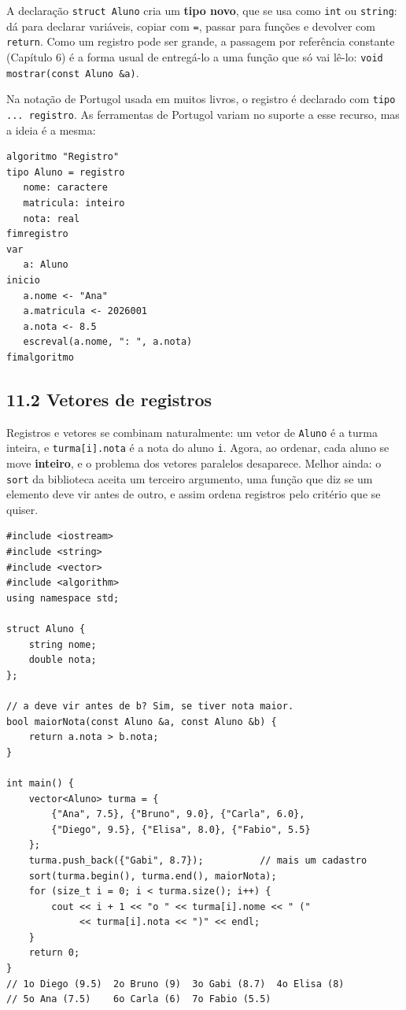 A declaração \texttt{struct Aluno} cria um \textbf{tipo novo}, que se usa como \texttt{int} ou \texttt{string}: dá para declarar variáveis, copiar com \texttt{=}, passar para funções e devolver com \texttt{return}. Como um registro pode ser grande, a passagem por referência constante (Capítulo 6) é a forma usual de entregá-lo a uma função que só vai lê-lo: \texttt{void mostrar(const Aluno \&a)}.

Na notação de Portugol usada em muitos livros, o registro é declarado com \texttt{tipo ... registro}. As ferramentas de Portugol variam no suporte a esse recurso, mas a ideia é a mesma:

\begin{codigo}
\begin{Verbatim}[breaklines=true, breaksymbolleft={}, fontsize=\footnotesize]
algoritmo "Registro"
tipo Aluno = registro
   nome: caractere
   matricula: inteiro
   nota: real
fimregistro
var
   a: Aluno
inicio
   a.nome <- "Ana"
   a.matricula <- 2026001
   a.nota <- 8.5
   escreval(a.nome, ": ", a.nota)
fimalgoritmo
\end{Verbatim}
\end{codigo}

\subsection{11.2 Vetores de registros}

Registros e vetores se combinam naturalmente: um vetor de \texttt{Aluno} é a turma inteira, e \texttt{turma[i].nota} é a nota do aluno \texttt{i}. Agora, ao ordenar, cada aluno se move \textbf{inteiro}, e o problema dos vetores paralelos desaparece. Melhor ainda: o \texttt{sort} da biblioteca aceita um terceiro argumento, uma função que diz se um elemento deve vir antes de outro, e assim ordena registros pelo critério que se quiser.

\begin{codigo}
\begin{Verbatim}[breaklines=true, breaksymbolleft={}, fontsize=\footnotesize]
#include <iostream>
#include <string>
#include <vector>
#include <algorithm>
using namespace std;

struct Aluno {
    string nome;
    double nota;
};

// a deve vir antes de b? Sim, se tiver nota maior.
bool maiorNota(const Aluno &a, const Aluno &b) {
    return a.nota > b.nota;
}

int main() {
    vector<Aluno> turma = {
        {"Ana", 7.5}, {"Bruno", 9.0}, {"Carla", 6.0},
        {"Diego", 9.5}, {"Elisa", 8.0}, {"Fabio", 5.5}
    };
    turma.push_back({"Gabi", 8.7});          // mais um cadastro
    sort(turma.begin(), turma.end(), maiorNota);
    for (size_t i = 0; i < turma.size(); i++) {
        cout << i + 1 << "o " << turma[i].nome << " ("
             << turma[i].nota << ")" << endl;
    }
    return 0;
}
// 1o Diego (9.5)  2o Bruno (9)  3o Gabi (8.7)  4o Elisa (8)
// 5o Ana (7.5)    6o Carla (6)  7o Fabio (5.5)
\end{Verbatim}
\end{codigo}

